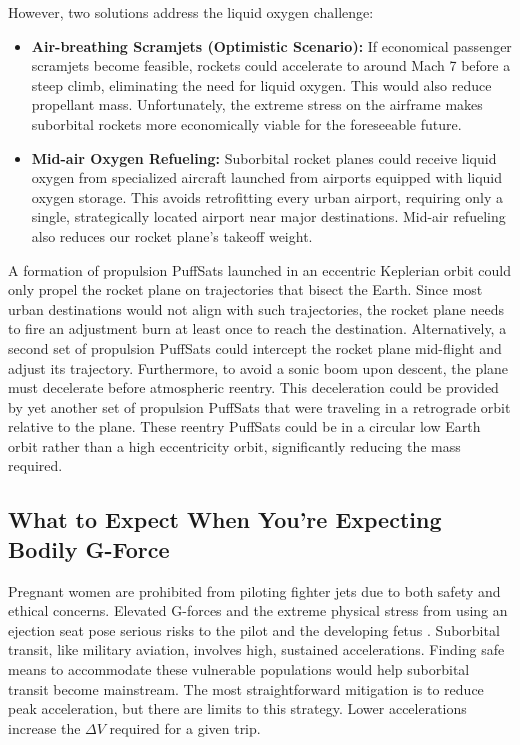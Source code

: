 \documentclass{article}
\begin{document}
{However, two solutions address the liquid oxygen challenge:
\begin{itemize}
\item \textbf{Air-breathing Scramjets (Optimistic Scenario):} If economical passenger scramjets become feasible, rockets could accelerate to around Mach 7 before a steep climb, eliminating the need for liquid oxygen. This would also reduce propellant mass. Unfortunately, the extreme stress on the airframe makes suborbital rockets more economically viable for the foreseeable future.
\item \textbf{Mid-air Oxygen Refueling:} Suborbital rocket planes could receive liquid oxygen from specialized aircraft launched from airports equipped with liquid oxygen storage. This avoids retrofitting every urban airport, requiring only a single, strategically located airport near major destinations.   Mid-air refueling also reduces our rocket plane's takeoff weight.
\end{itemize}

A formation of propulsion PuffSats launched in an eccentric Keplerian orbit could only propel the  rocket plane on trajectories that bisect the Earth. Since most urban destinations would not align with such trajectories, the rocket plane needs to fire an adjustment burn at least once to reach the destination. Alternatively, a second set of propulsion PuffSats could intercept the rocket plane mid-flight and adjust its trajectory. Furthermore, to avoid a sonic boom upon descent, the plane must decelerate before atmospheric reentry. This deceleration could be provided by yet another set of propulsion PuffSats that were traveling in a retrograde orbit relative to the plane. These reentry PuffSats could be in a circular low Earth orbit rather than a high eccentricity orbit, significantly reducing the mass required.

\subsection{What to Expect When You're Expecting Bodily G-Force \cite{expecting_pregnancy_book}} \label{sec:pregnant_women}

Pregnant women are prohibited from piloting fighter jets due to both safety and ethical concerns. Elevated G-forces and the extreme physical stress from using an ejection seat pose serious risks to the pilot and the developing fetus \cite{pregnancy_gforce_risk}. Suborbital transit, like military aviation, involves high, sustained accelerations.  Finding safe means to accommodate these vulnerable populations would help suborbital transit become mainstream.  The most straightforward mitigation is to reduce peak acceleration, but there are limits to this strategy.  Lower accelerations increase the $\Delta V$ required for a given trip.  

}
\end{document}
